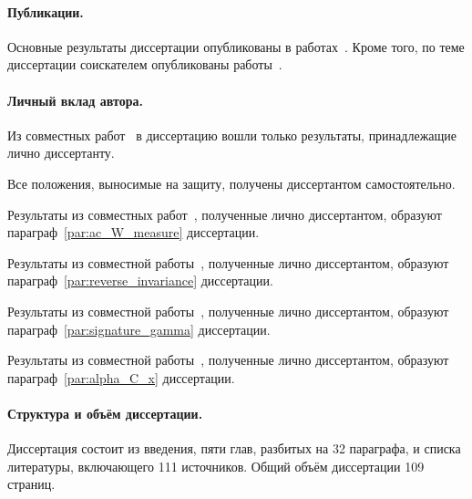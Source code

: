 \paragraph{Публикации.}
Основные результаты диссертации опубликованы в работах~.
Кроме того, по теме диссертации соискателем опубликованы работы~.

\paragraph{Личный вклад автора.}

Из совместных работ~
в диссертацию вошли только результаты, принадлежащие лично диссертанту.

Все положения, выносимые на защиту, получены диссертантом самостоятельно.





Результаты из совместных работ~\cite{our-mz2019measure,avdeed2021AandA},
полученные лично диссертантом, образуют параграф~\ref{par:ac_W_measure} диссертации.

Результаты из совместной работы~\cite{avdeev2024decomposition},
полученные лично диссертантом, образуют параграф~\ref{par:reverse_invariance} диссертации.

Результаты из совместной работы~\cite{avdeev2024set_DAN_rus},
полученные лично диссертантом, образуют параграф~\ref{par:signature_gamma} диссертации.

Результаты из совместной работы~\cite{our-vzms-2018},
полученные лично диссертантом, образуют параграф~\ref{par:alpha_C_x} диссертации.



\paragraph{Структура и объём диссертации.}
Диссертация состоит из введения, пяти глав, разбитых на
32 параграфа,
и списка литературы, включающего
111 источников.
Общий объём диссертации
109 страниц.
